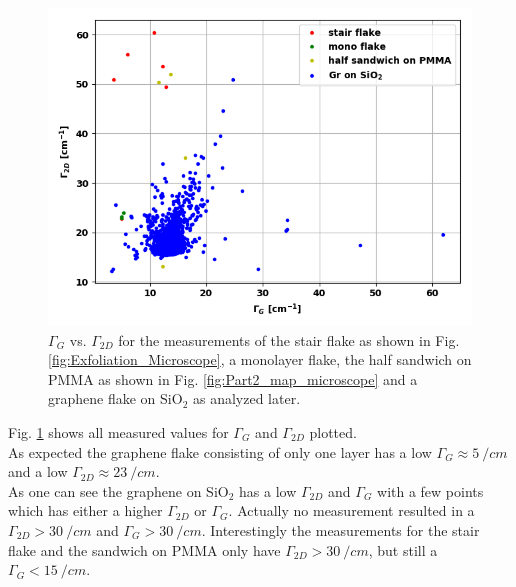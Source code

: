 \documentclass[%
 reprint,
amsmath,amssymb,
pra,
]{revtex4-1}
\begin{document}
\begin{figure}
\centering
\includegraphics[scale=0.55]{Bilder/Part_3/gamma_2D_vs_G.PNG}
\caption{$\Gamma _G$ vs. $\Gamma _{2D}$ for the measurements of the stair flake as shown in Fig. \ref{fig:Exfoliation_Microscope}, a monolayer flake, the half sandwich on PMMA as shown in Fig. \ref{fig:Part2_map_microscope} and a graphene flake on SiO$_2$ as analyzed later.}
\label{fig:Part3_gamma_G_vs_2D}
\end{figure}

Fig. \ref{fig:Part3_gamma_G_vs_2D} shows all measured values for $\Gamma _G$ and $\Gamma _{2D}$ plotted. \\ 
As expected the graphene flake consisting of only one layer has a low $\Gamma _G \approx \SI{5}{\per cm}$ and a low $\Gamma _{2D} \approx \SI{23}{\per cm}$. \\
As one can see the graphene on SiO$_2$ has a low $\Gamma _{2D}$ and $\Gamma _G$ with a few points which has either a higher $\Gamma _{2D}$ or $\Gamma _G$. Actually no measurement resulted in a $\Gamma _{2D} > \SI{30}{\per cm}$ and $\Gamma _G > \SI{30}{\per cm}$. Interestingly the measurements for the stair flake and the sandwich on PMMA only have $\Gamma _{2D} > \SI{30}{\per cm}$, but still a $\Gamma _G < \SI{15}{\per cm}$.















\end{document}
